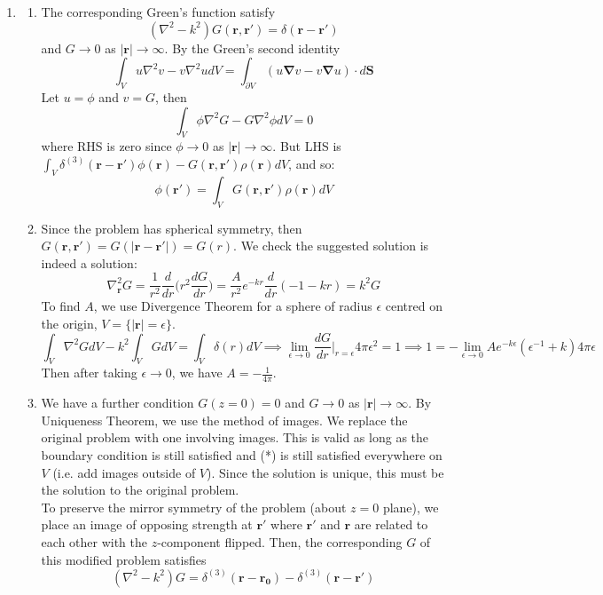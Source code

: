 \documentclass[a4paper]{article}
\begin{document}
\begin{ans}\leavevmode
\begin{enumerate}[label=(\alph*)]
\item 
\begin{enumerate}[label=(\roman*)]
\item The corresponding Green's function satisfy
$$(\nabla^2-k^2)G(\mathbf{r},\mathbf{r'})=\delta(\mathbf{r}-\mathbf{r'})$$
and $G\rightarrow 0$ as $|\mathbf{r}|\rightarrow\infty$. By the Green's second identity
$$\int_Vu\nabla^2v-v\nabla^2udV=\int_{\partial V}(u\boldsymbol{\nabla}v-v\boldsymbol{\nabla}u)\cdot d\mathbf{S}$$
Let $u=\phi$ and $v=G$, then 
$$\int_V\phi\nabla^2G-G\nabla^2\phi dV=0$$
where RHS is zero since $\phi\rightarrow 0$ as $|\mathbf{r}|\rightarrow\infty$. But LHS is $\int_V\delta^{(3)}(\mathbf{r}-\mathbf{r'})\phi(\mathbf{r})-G(\mathbf{r},\mathbf{r'})\rho(\mathbf{r})dV$, and so:
$$\phi(\mathbf{r'})=\int_VG(\mathbf{r},\mathbf{r'})\rho(\mathbf{r})dV$$
\item Since the problem has spherical symmetry, then $G(\mathbf{r},\mathbf{r'})=G(|\mathbf{r}-\mathbf{r'}|)=G(r)$. We check the suggested solution is indeed a solution:
$$\nabla_{\mathbf{r}}^2G=\frac{1}{r^2}\frac{d}{dr}\bigg(r^2\frac{dG}{dr}\bigg)=\frac{A}{r^2}e^{-kr}\frac{d}{dr}(-1-kr)=k^2G$$
To find $A$, we use Divergence Theorem for a sphere of radius $\epsilon$ centred on the origin, $V=\{|\mathbf{r}|=\epsilon\}$.
$$\int_V\nabla^2GdV-k^2\int_VGdV=\int_V\delta(r)dV\implies\lim_{\epsilon\rightarrow0}\frac{dG}{dr}\bigg|_{r=\epsilon}4\pi\epsilon^2=1\implies 1=-\lim_{\epsilon\rightarrow0}Ae^{-k\epsilon}(\epsilon^{-1}+k)4\pi\epsilon$$
Then after taking $\epsilon\rightarrow 0$, we have $A=-\frac{1}{4\pi}$.
\item We have a further condition $G(z=0)=0$ and $G\rightarrow 0$ as $|\mathbf{r}|\rightarrow\infty$. By Uniqueness Theorem, we use the method of images. We replace the original problem with one involving images. This is valid as long as the boundary condition is still satisfied and (*) is still satisfied everywhere on $V$ (i.e. add images outside of $V$). Since the solution is unique, this must be the solution to the original problem.\\[5pt]
To preserve the mirror symmetry of the problem (about $z=0$ plane), we place an image of opposing strength at $\mathbf{r'}$ where $\mathbf{r'}$ and $\mathbf{r}$ are related to each other with the $z$-component flipped. Then, the corresponding $G$ of this modified problem satisfies
$$(\nabla^2-k^2)G=\delta^{(3)}(\mathbf{r}-\mathbf{r_0})-\delta^{(3)}(\mathbf{r}-\mathbf{r'})$$

\end{enumerate}
\end{enumerate}
\end{ans}
\end{document}
